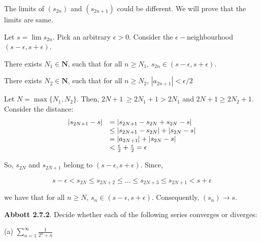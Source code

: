 \documentclass[10pt]{article}
\begin{document}
The limits of $\displaystyle ( s_{2n})$ and $\displaystyle ( s_{2n+1})$ could be different. We will prove that the limits are same.



Let $\displaystyle s=\lim s_{2n}$. Pick an arbitrary $\displaystyle \epsilon  >0$. Consider the $\displaystyle \epsilon -$neighbourhood $\displaystyle ( s-\epsilon ,s+\epsilon )$. 



There exists $\displaystyle N_{1} \in \mathbf{N}$, such that for all $\displaystyle n\geq N_{1}$, $\displaystyle s_{2n} \in ( s-\epsilon ,s+\epsilon )$. 



There exists $\displaystyle N_{2} \in \mathbf{N}$, such that for all $\displaystyle n\geq N_{2}$, $\displaystyle |a_{2n+1} |< \epsilon /2$



 Let $\displaystyle N=\max\{N_{1} ,N_{2}\}$. Then, $\displaystyle 2N+1\ \geq 2N_{1} +1 >2N_{1}$ and $\displaystyle 2N+1\geq 2N_{2} +1$. Consider the distance:
\begin{equation*}
\begin{array}{ c l }
|s_{2N+1} -s| & =|s_{2N+1} -s_{2N} +s_{2N} -s|\\
 & \leq |s_{2N+1} -s_{2N} |+|s_{2N} -s|\\
 & =|a_{2N+1} |+|s_{2N} -s|\\
 & < \frac{\epsilon }{2} +\frac{\epsilon }{2} =\epsilon 
\end{array}
\end{equation*}


So, $\displaystyle s_{2N}$ and $\displaystyle s_{2N+1}$ belong to $\displaystyle ( s-\epsilon ,s+\epsilon )$. Since, 


\begin{equation*}
s-\epsilon < s_{2N} \leq s_{2N+2} \leq \dotsc \leq s_{2N+3} \leq s_{2N+1} < s+\epsilon 
\end{equation*}


we have that for all $\displaystyle n\geq N$, $\displaystyle s_{n} \in ( s-\epsilon ,s+\epsilon )$. Consequently, $\displaystyle ( s_{n})\rightarrow s$.



\textbf{Abbott 2.7.2}. Decide whether each of the following series converges or diverges:



(a) $\displaystyle \sum _{n=1}^{\infty }\frac{1}{2^{n} +n}$
\end{document}
